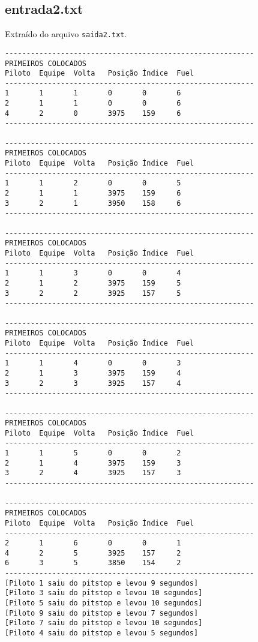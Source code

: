 \documentclass[12pt]{article}
\begin{document}

\subsection{entrada2.txt}

Extraído do arquivo \verb|saida2.txt|.

\begin{verbatim}
----------------------------------------------------------
PRIMEIROS COLOCADOS
Piloto  Equipe  Volta   Posição Índice  Fuel
----------------------------------------------------------
1       1       1       0       0       6
2       1       1       0       0       6
4       2       0       3975    159     6
----------------------------------------------------------

----------------------------------------------------------
PRIMEIROS COLOCADOS
Piloto  Equipe  Volta   Posição Índice  Fuel
----------------------------------------------------------
1       1       2       0       0       5
2       1       1       3975    159     6
3       2       1       3950    158     6
----------------------------------------------------------

----------------------------------------------------------
PRIMEIROS COLOCADOS
Piloto  Equipe  Volta   Posição Índice  Fuel
----------------------------------------------------------
1       1       3       0       0       4
2       1       2       3975    159     5
3       2       2       3925    157     5
----------------------------------------------------------

----------------------------------------------------------
PRIMEIROS COLOCADOS
Piloto  Equipe  Volta   Posição Índice  Fuel
----------------------------------------------------------
1       1       4       0       0       3
2       1       3       3975    159     4
3       2       3       3925    157     4
----------------------------------------------------------

----------------------------------------------------------
PRIMEIROS COLOCADOS
Piloto  Equipe  Volta   Posição Índice  Fuel
----------------------------------------------------------
1       1       5       0       0       2
2       1       4       3975    159     3
3       2       4       3925    157     3
----------------------------------------------------------

----------------------------------------------------------
PRIMEIROS COLOCADOS
Piloto  Equipe  Volta   Posição Índice  Fuel
----------------------------------------------------------
2       1       6       0       0       1
4       2       5       3925    157     2
6       3       5       3850    154     2
----------------------------------------------------------
[Piloto 1 saiu do pitstop e levou 9 segundos]
[Piloto 3 saiu do pitstop e levou 10 segundos]
[Piloto 5 saiu do pitstop e levou 10 segundos]
[Piloto 9 saiu do pitstop e levou 7 segundos]
[Piloto 7 saiu do pitstop e levou 10 segundos]
[Piloto 4 saiu do pitstop e levou 5 segundos]


\end{verbatim}
\end{document}
